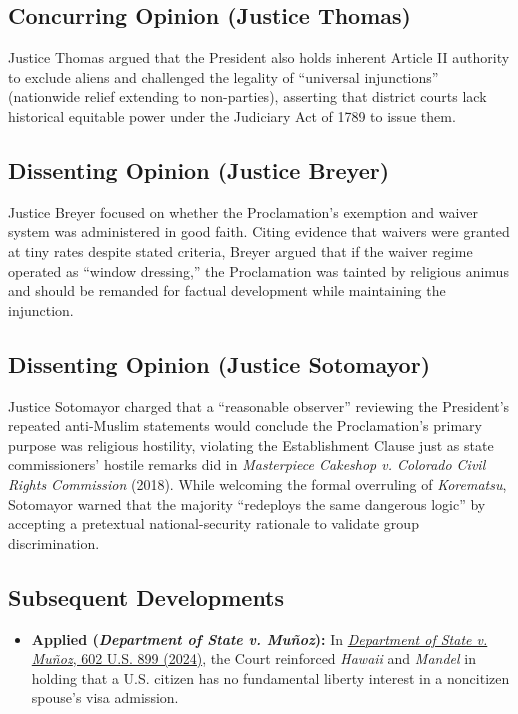 \documentclass[12pt]{article}
\begin{document}
\subsection{Concurring Opinion (Justice Thomas)}

Justice Thomas argued that the President also holds inherent Article II authority to exclude aliens and challenged the legality of ``universal injunctions'' (nationwide relief extending to non-parties), asserting that district courts lack historical equitable power under the Judiciary Act of 1789 to issue them.

\subsection{Dissenting Opinion (Justice Breyer)}

Justice Breyer focused on whether the Proclamation's exemption and waiver system was administered in good faith. Citing evidence that waivers were granted at tiny rates despite stated criteria, Breyer argued that if the waiver regime operated as ``window dressing,'' the Proclamation was tainted by religious animus and should be remanded for factual development while maintaining the injunction.

\subsection{Dissenting Opinion (Justice Sotomayor)}

Justice Sotomayor charged that a ``reasonable observer'' reviewing the President's repeated anti-Muslim statements would conclude the Proclamation's primary purpose was religious hostility, violating the Establishment Clause just as state commissioners' hostile remarks did in \textit{Masterpiece Cakeshop v. Colorado Civil Rights Commission} (2018). While welcoming the formal overruling of \textit{Korematsu}, Sotomayor warned that the majority ``redeploys the same dangerous logic'' by accepting a pretextual national-security rationale to validate group discrimination.

\subsection{Subsequent Developments}

\begin{itemize}

\item \textbf{Applied (\textit{Department of State v. Mu\~noz}):} In \href{https://supreme.justia.com/cases/federal/us/602/23-334/}{\textit{Department of State v. Mu\~noz}, 602 U.S. 899 (2024)}, the Court reinforced \textit{Hawaii} and \textit{Mandel} in holding that a U.S. citizen has no fundamental liberty interest in a noncitizen spouse's visa admission.

\end{itemize}
\end{document}
